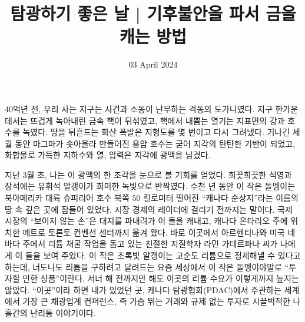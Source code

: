 \documentclass{translation}
\date{03 April 2024}
\title{탐광하기 좋은 날 | 기후불안을 파서 금을 캐는 방법}
\begin{document}
40억년 전, 우리 사는 지구는 사건과 소동이 난무하는 격동의 도가니였다.
지구 한가운데서는 뜨겁게 녹아내린 금속 핵이 뒤섞였고, 핵에서 내뿜는 열기는 지표면의 강과 호수를 녹였다.
땅을 뒤흔드는 화산 폭발은 지형도를 몇 번이고 다시 그려냈다.
기나긴 세월 동안 마그마가 솟아올라 만들어진 용암 호수는 굳어 지각의 탄탄한 기반이 되었고,
화합물로 가득한 지하수와 열, 압력은 지각에 광맥을 남겼다.
%

지난 3월 초, 나는 이 광맥의 한 조각을 눈으로 볼 기회를 얻었다.
희끗희끗한 석영과 장석에는 유휘석 알갱이가 희미한 녹빛으로 반짝였다.
수천 년 동안 이 작은 돌멩이는 북아메리카 대륙 슈피리어 호수 북쪽 50 킬로미터 떨어진 ``캐나다 순상지''라는 이름의 땅 속 깊은 곳에 잠들어 있었다.
시장 경제의 레이더에 걸리기 전까지는 말이다.
국제 시장의 ``보이지 않는 손''은 대지를 파내려가 이 돌을 캐내고, 캐나다 온타리오 주에 위치한 메트로 토론토 컨벤션 센터까지 옮겨 왔다.
바로 이곳에서 아르헨티나와 미국 네바다 주에서 리튬 채굴 작업을 돕고 있는 친절한 지질학자 라민 가데르파나 씨가 나에게 이 돌을 보여 주었다.
이 작은 초록빛 알갱이는 고순도 리튬으로 정제해낼 수 있다고 하는데,
너도나도 리튬을 구하려고 달려드는 요즘 세상에서 이 작은 돌멩이야말로 ``투자할 만한 상품''이란다.
서너 해 전까지만 해도 이곳의 리튬 수요가 이렇게까지 높지는 않았다.
``이곳''이라 하면 내가 있었던 곳, 캐나다 탐광 협회(PDAC)에서 주관하는 세계에서 가장 큰 채광업계 컨퍼런스, 즉 가슴 뛰는 거래와 규제 없는 투자로 시끌벅적한 나흘간의 난리통 이야기이다.
%
\end{document}
